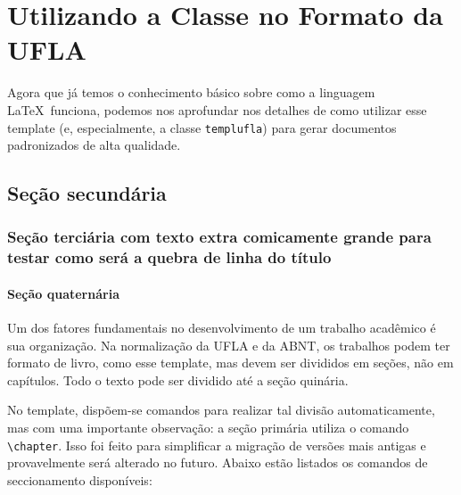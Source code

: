 \chapter{Utilizando a Classe no Formato da UFLA}\label{sec:template}

Agora que já temos o conhecimento básico sobre como a linguagem \LaTeX\ funciona, podemos nos aprofundar nos detalhes de como utilizar esse template (e, especialmente, a classe \texttt{templufla}) para gerar documentos padronizados de alta qualidade.

\section{Seção secundária}\label{sec2:secoes}
\subsection{Seção terciária com texto extra comicamente grande para testar como será a quebra de linha do título}\label{sec3:teste}
\subsubsection{Seção quaternária}\label{sec4:teste}
\label{sec5:teste}

Um dos fatores fundamentais no desenvolvimento de um trabalho acadêmico é sua organização. Na normalização da UFLA e da ABNT, os trabalhos podem ter formato de livro, como esse template, mas devem ser divididos em seções, não em capítulos. Todo o texto pode ser dividido até a seção quinária.

No template, dispõem-se comandos para realizar tal divisão automaticamente, mas com uma importante observação: a seção primária utiliza o comando \verb|\chapter|. Isso foi feito para simplificar a migração de versões mais antigas e provavelmente será alterado no futuro. Abaixo estão listados os comandos de seccionamento disponíveis: 

